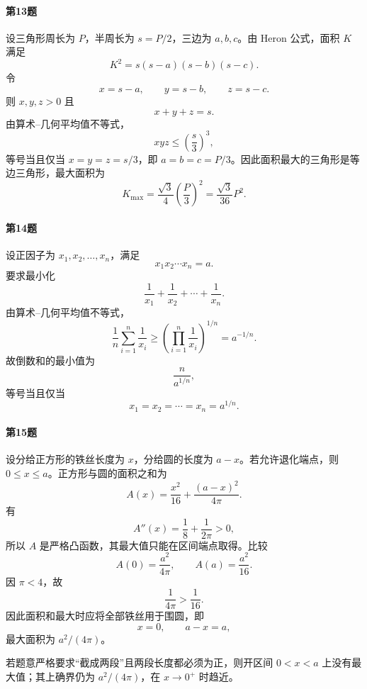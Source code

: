 \paragraph{第13题}
\begin{xsolution}
设三角形周长为 $P$，半周长为 $s=P/2$，三边为 $a,b,c$。由 Heron 公式，面积 $K$ 满足
\[
  K^2=s(s-a)(s-b)(s-c).
\]
令
\[
  x=s-a,
  \qquad
  y=s-b,
  \qquad
  z=s-c.
\]
则 $x,y,z>0$ 且
\[
  x+y+z=s.
\]
由算术--几何平均值不等式，
\[
  xyz\le\left(\frac s3\right)^3,
\]
等号当且仅当 $x=y=z=s/3$，即 $a=b=c=P/3$。因此面积最大的三角形是等边三角形，最大面积为
\[
  K_{\max}=\frac{\sqrt3}{4}\left(\frac P3\right)^2
  =\frac{\sqrt3}{36}P^2.
\]
\end{xsolution}

\paragraph{第14题}
\begin{xsolution}
设正因子为 $x_1,x_2,\ldots,x_n$，满足
\[
  x_1x_2\cdots x_n=a.
\]
要求最小化
\[
  \frac1{x_1}+\frac1{x_2}+\cdots+\frac1{x_n}.
\]
由算术--几何平均值不等式，
\[
  \frac1n\sum_{i=1}^n\frac1{x_i}
  \ge\left(\prod_{i=1}^n\frac1{x_i}\right)^{1/n}
  =a^{-1/n}.
\]
故倒数和的最小值为
\[
  \frac n{a^{1/n}},
\]
等号当且仅当
\[
  x_1=x_2=\cdots=x_n=a^{1/n}.
\]
\end{xsolution}

\paragraph{第15题}
\begin{xsolution}
设分给正方形的铁丝长度为 $x$，分给圆的长度为 $a-x$。若允许退化端点，则 $0\le x\le a$。正方形与圆的面积之和为
\[
  A(x)=\frac{x^2}{16}+\frac{(a-x)^2}{4\pi}.
\]
有
\[
  A''(x)=\frac18+\frac1{2\pi}>0,
\]
所以 $A$ 是严格凸函数，其最大值只能在区间端点取得。比较
\[
  A(0)=\frac{a^2}{4\pi},
  \qquad
  A(a)=\frac{a^2}{16}.
\]
因 $\pi<4$，故
\[
  \frac1{4\pi}>\frac1{16}.
\]
因此面积和最大时应将全部铁丝用于围圆，即
\[
  x=0,
  \qquad
  a-x=a,
\]
最大面积为 $a^2/(4\pi)$。

若题意严格要求“截成两段”且两段长度都必须为正，则开区间 $0<x<a$ 上没有最大值；其上确界仍为 $a^2/(4\pi)$，在 $x\to0^+$ 时趋近。
\end{xsolution}
